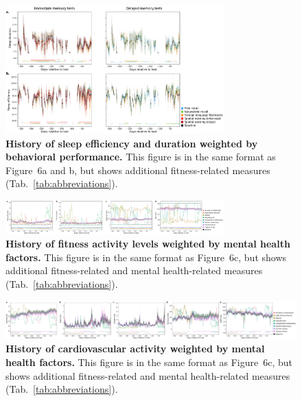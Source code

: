 \documentclass[10pt]{article}
\newcommand{\dynamics}{6}
\begin{document}
\begin{figure}[p]
  \centering
  \includegraphics[width=0.75\textwidth]{figs/weighted_timecourse_sleep}
\caption{\textbf{History of sleep efficiency and duration weighted by
    behavioral performance.}  This figure is in the same format as
  Figure~\dynamics a and b, but shows additional fitness-related measures (Tab.~\ref{tab:abbreviations}).}
\label{fig:sleep_timecourse}
\end{figure}

\begin{figure}
  \centering
  \includegraphics[width=0.75\textwidth]{figs/weighted_timecourse_activity_MH}
\caption{\textbf{History of fitness activity levels weighted by
    mental health factors.}  This figure is in the same format as
  Figure~\dynamics c, but shows additional fitness-related and mental
  health-related measures (Tab.~\ref{tab:abbreviations}).}
\label{fig:activity_timecourse_MH}
\end{figure}

\begin{figure}
  \centering
  \includegraphics[width=\textwidth]{figs/weighted_timecourse_HR_MH}
\caption{\textbf{History of cardiovascular activity weighted by
    mental health factors.} This figure is in the same format as
  Figure~\dynamics c, but shows additional fitness-related and mental
  health-related measures (Tab.~\ref{tab:abbreviations}).}
\label{fig:HR_timecourse_MH}
  \end{figure}
\end{document}

